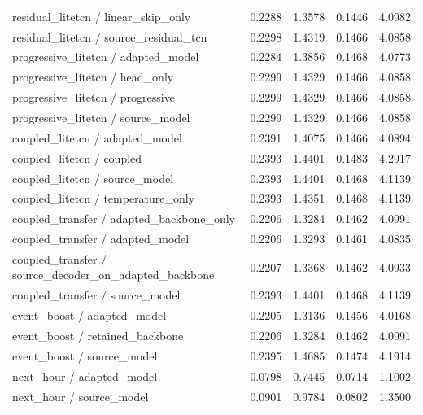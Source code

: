 {\begin{longtable}{@{}p{}p{}p{}p{}p{}@{}}
residual\_\allowbreak{}litetcn / linear\_\allowbreak{}skip\_\allowbreak{}only & 0.2288 & 1.3578 & 0.1446 & 4.0982 \\
residual\_\allowbreak{}litetcn / source\_\allowbreak{}residual\_\allowbreak{}tcn & 0.2298 & 1.4319 & 0.1466 & 4.0858 \\
progressive\_\allowbreak{}litetcn / adapted\_\allowbreak{}model & 0.2284 & 1.3856 & 0.1468 & 4.0773 \\
progressive\_\allowbreak{}litetcn / head\_\allowbreak{}only & 0.2299 & 1.4329 & 0.1466 & 4.0858 \\
progressive\_\allowbreak{}litetcn / progressive & 0.2299 & 1.4329 & 0.1466 & 4.0858 \\
progressive\_\allowbreak{}litetcn / source\_\allowbreak{}model & 0.2299 & 1.4329 & 0.1466 & 4.0858 \\
coupled\_\allowbreak{}litetcn / adapted\_\allowbreak{}model & 0.2391 & 1.4075 & 0.1466 & 4.0894 \\
coupled\_\allowbreak{}litetcn / coupled & 0.2393 & 1.4401 & 0.1483 & 4.2917 \\
coupled\_\allowbreak{}litetcn / source\_\allowbreak{}model & 0.2393 & 1.4401 & 0.1468 & 4.1139 \\
coupled\_\allowbreak{}litetcn / temperature\_\allowbreak{}only & 0.2393 & 1.4351 & 0.1468 & 4.1139 \\
coupled\_\allowbreak{}transfer / adapted\_\allowbreak{}backbone\_\allowbreak{}only & 0.2206 & 1.3284 & 0.1462 & 4.0991 \\
coupled\_\allowbreak{}transfer / adapted\_\allowbreak{}model & 0.2206 & 1.3293 & 0.1461 & 4.0835 \\
coupled\_\allowbreak{}transfer / source\_\allowbreak{}decoder\_\allowbreak{}on\_\allowbreak{}adapted\_\allowbreak{}backbone & 0.2207 & 1.3368 & 0.1462 & 4.0933 \\
coupled\_\allowbreak{}transfer / source\_\allowbreak{}model & 0.2393 & 1.4401 & 0.1468 & 4.1139 \\
event\_\allowbreak{}boost / adapted\_\allowbreak{}model & 0.2205 & 1.3136 & 0.1456 & 4.0168 \\
event\_\allowbreak{}boost / retained\_\allowbreak{}backbone & 0.2206 & 1.3284 & 0.1462 & 4.0991 \\
event\_\allowbreak{}boost / source\_\allowbreak{}model & 0.2395 & 1.4685 & 0.1474 & 4.1914 \\
next\_\allowbreak{}hour / adapted\_\allowbreak{}model & 0.0798 & 0.7445 & 0.0714 & 1.1002 \\
next\_\allowbreak{}hour / source\_\allowbreak{}model & 0.0901 & 0.9784 & 0.0802 & 1.3500 \\

\end{longtable}}
